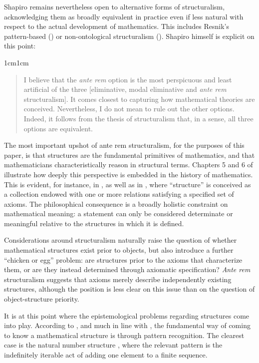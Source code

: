 \documentclass[11pt,a4paper]{article}
\begin{document}
Shapiro remains nevertheless open to alternative forms of structuralism, acknowledging them as broadly equivalent in practice even if less natural with respect to the actual development of mathematics. This includes Resnik's pattern-based (\citeyear{Resnik1981}) or non-ontological structuralism (\citeyear{Resnik2018NonOntological}). Shapiro himself is explicit on this point:

\begin{adjustwidth}{1cm}{1cm}
\small
\begin{quote}
I believe that the \textit{ante rem} option is the most perspicuous and least artificial of the three [eliminative, modal eliminative and \textit{ante rem} structuralism]. It comes closest to capturing how mathematical theories are conceived. Nevertheless, I do not mean to rule out the other options. Indeed, it follows from the thesis of structuralism that, in a sense, all three options are equivalent. \parencite[p. 90]{Shapiro1997}
\end{quote}
\end{adjustwidth}

The most important upshot of ante rem structuralism, for the purposes of this paper, is that structures are the fundamental primitives of mathematics, and that mathematicians characteristically reason in structural terms. Chapters 5 and 6 of \textcite{Shapiro1997} illustrate how deeply this perspective is embedded in the history of mathematics. This is evident, for instance, in \textcite{Dedekind1888}, as well as in \textcite{Bourbaki1950}, where “structure” is conceived as a collection endowed with one or more relations satisfying a specified set of axioms. The philosophical consequence is a broadly holistic constraint on mathematical meaning: a statement can only be considered determinate or meaningful relative to the structures in which it is defined.

Considerations around structuralism naturally raise the question of whether mathematical structures exist prior to objects, but also introduce a further “chicken or egg” problem: are structures prior to the axioms that characterize them, or are they instead determined through axiomatic specification? \textit{Ante rem} structuralism suggests that axioms merely describe independently existing structures, although the position is less clear on this issue than on the question of object-structure priority.

It is at this point where the epistemological problems regarding structures come into play. According to \textcite{Shapiro1997}, and much in line with \textcite{Resnik1981}, the fundamental way of coming to know a mathematical structure is through pattern recognition. The clearest case is the natural number structure \parencite[pp. 118-119]{Shapiro1997}, where the relevant pattern is the indefinitely iterable act of adding one element to a finite sequence.
\end{document}
